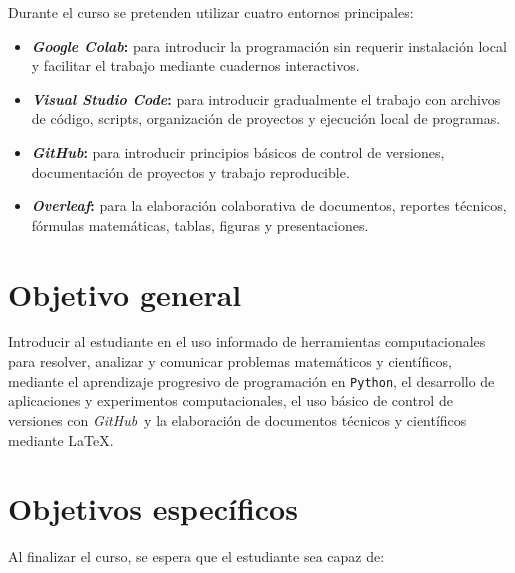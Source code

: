 \documentclass[12pt,letterpaper]{article}
\newcommand{\python}{\texttt{Python}}
\newcommand{\latexname}{\LaTeX}
\newcommand{\colab}{\textit{Google Colab}}
\newcommand{\vscode}{\textit{Visual Studio Code}}
\newcommand{\github}{\textit{GitHub}}
\newcommand{\overleaf}{\textit{Overleaf}}
\begin{document}
Durante el curso se pretenden utilizar cuatro entornos principales:

\begin{itemize}
    \item \textbf{\colab:} para introducir la programación sin requerir
    instalación local y facilitar el trabajo mediante cuadernos interactivos.
    
    \item \textbf{\vscode:} para introducir gradualmente el trabajo con
    archivos de código, scripts, organización de proyectos y ejecución
    local de programas.
    
    \item \textbf{\github:} para introducir principios básicos de control
    de versiones, documentación de proyectos y trabajo reproducible.
    
    \item \textbf{\overleaf:} para la elaboración colaborativa de documentos,
    reportes técnicos, fórmulas matemáticas, tablas, figuras y presentaciones.
\end{itemize}

\section{Objetivo general}

Introducir al estudiante en el uso informado de herramientas
computacionales para resolver, analizar y comunicar problemas
matemáticos y científicos, mediante el aprendizaje progresivo de
programación en \python, el desarrollo de aplicaciones y experimentos
computacionales, el uso básico de control de versiones con \github\ y
la elaboración de documentos técnicos y científicos mediante
\latexname.

\section{Objetivos específicos}

Al finalizar el curso, se espera que el estudiante sea capaz de:
\end{document}
